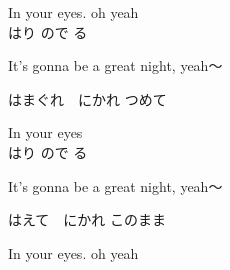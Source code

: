 \documentclass[]{article}
\begin{document}
\begin{spacing}{1.15}
{In your eyes. oh yeah
\\

はり
ので
る　

It's gonna be a great night, yeah～

はまぐれ　にかれ
つめて　

In your eyes
\\

はり
ので
る　

It's gonna be a great night, yeah～

はえて　にかれ
このまま 

In your eyes. oh yeah
}

\end{spacing}
\end{document}

